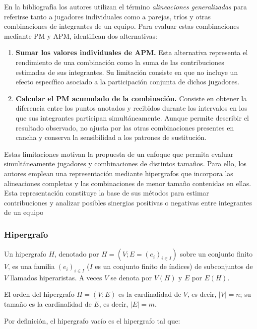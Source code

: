 En la bibliografía los autores utilizan el término \textit{alineaciones generalizadas}
para referirse tanto a jugadores individuales como a parejas,
tríos y otras combinaciones de integrantes de un equipo.
Para evaluar estas combinaciones mediante PM y APM, identifican
dos alternativas:

\begin{enumerate}
    \item \textbf{Sumar los valores individuales de APM.}
    Esta alternativa representa el rendimiento de una combinación
    como la suma de las contribuciones estimadas de sus integrantes.
    Su limitación consiste en que no incluye un efecto específico
    asociado a la participación conjunta de dichos jugadores.

    \item \textbf{Calcular el PM acumulado de la combinación.}
    Consiste en obtener la diferencia entre los puntos anotados
    y recibidos durante los intervalos en los que sus integrantes
    participan simultáneamente. Aunque permite describir el
    resultado observado, no ajusta por las otras combinaciones
    presentes en cancha y conserva la sensibilidad a los patrones
    de sustitución.
\end{enumerate}

Estas limitaciones motivan la propuesta de un enfoque que permita
evaluar simultáneamente jugadores y combinaciones de distintos
tamaños. Para ello, los autores emplean una representación
mediante hipergrafos que incorpora las alineaciones completas
y las combinaciones de menor tamaño contenidas en ellas.
Esta representación constituye la base de sus métodos para
estimar contribuciones y analizar posibles sinergias positivas
o negativas entre integrantes de un equipo
\cite{josephs2025hypergraphadjustedplusminus}

\subsubsection{Hipergrafo}
Un hipergrafo $H$, denotado por $H = (V; E = (e_i)_{i \in I})$ sobre un conjunto finito $V$, es una familia $(e_i)_{i \in I}$ ($I$ es un conjunto finito de índices) de subconjuntos de $V$ llamados hiperaristas. A veces $V$ se denota por $V(H)$ y $E$ por $E(H)$.

El orden del hipergrafo $H = (V; E)$ es la cardinalidad de $V$, es decir, $|V| = n$; su tamaño es la cardinalidad de $E$, es decir, $|E| = m$.

Por definición, el hipergrafo vacío es el hipergrafo tal que:


